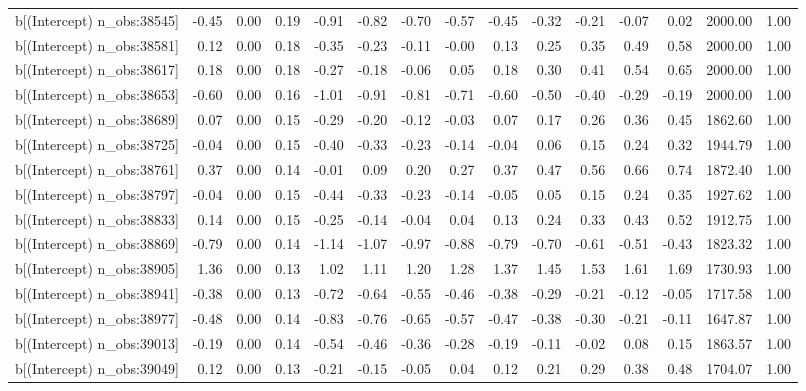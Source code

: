 \begin{table}[ht]
\begin{tabular}{rrrrrrrrrrrrrrr}
  b[(Intercept) n\_obs:38545] & -0.45 & 0.00 & 0.19 & -0.91 & -0.82 & -0.70 & -0.57 & -0.45 & -0.32 & -0.21 & -0.07 & 0.02 & 2000.00 & 1.00 \\ 
  b[(Intercept) n\_obs:38581] & 0.12 & 0.00 & 0.18 & -0.35 & -0.23 & -0.11 & -0.00 & 0.13 & 0.25 & 0.35 & 0.49 & 0.58 & 2000.00 & 1.00 \\ 
  b[(Intercept) n\_obs:38617] & 0.18 & 0.00 & 0.18 & -0.27 & -0.18 & -0.06 & 0.05 & 0.18 & 0.30 & 0.41 & 0.54 & 0.65 & 2000.00 & 1.00 \\ 
  b[(Intercept) n\_obs:38653] & -0.60 & 0.00 & 0.16 & -1.01 & -0.91 & -0.81 & -0.71 & -0.60 & -0.50 & -0.40 & -0.29 & -0.19 & 2000.00 & 1.00 \\ 
  b[(Intercept) n\_obs:38689] & 0.07 & 0.00 & 0.15 & -0.29 & -0.20 & -0.12 & -0.03 & 0.07 & 0.17 & 0.26 & 0.36 & 0.45 & 1862.60 & 1.00 \\ 
  b[(Intercept) n\_obs:38725] & -0.04 & 0.00 & 0.15 & -0.40 & -0.33 & -0.23 & -0.14 & -0.04 & 0.06 & 0.15 & 0.24 & 0.32 & 1944.79 & 1.00 \\ 
  b[(Intercept) n\_obs:38761] & 0.37 & 0.00 & 0.14 & -0.01 & 0.09 & 0.20 & 0.27 & 0.37 & 0.47 & 0.56 & 0.66 & 0.74 & 1872.40 & 1.00 \\ 
  b[(Intercept) n\_obs:38797] & -0.04 & 0.00 & 0.15 & -0.44 & -0.33 & -0.23 & -0.14 & -0.05 & 0.05 & 0.15 & 0.24 & 0.35 & 1927.62 & 1.00 \\ 
  b[(Intercept) n\_obs:38833] & 0.14 & 0.00 & 0.15 & -0.25 & -0.14 & -0.04 & 0.04 & 0.13 & 0.24 & 0.33 & 0.43 & 0.52 & 1912.75 & 1.00 \\ 
  b[(Intercept) n\_obs:38869] & -0.79 & 0.00 & 0.14 & -1.14 & -1.07 & -0.97 & -0.88 & -0.79 & -0.70 & -0.61 & -0.51 & -0.43 & 1823.32 & 1.00 \\ 
  b[(Intercept) n\_obs:38905] & 1.36 & 0.00 & 0.13 & 1.02 & 1.11 & 1.20 & 1.28 & 1.37 & 1.45 & 1.53 & 1.61 & 1.69 & 1730.93 & 1.00 \\ 
  b[(Intercept) n\_obs:38941] & -0.38 & 0.00 & 0.13 & -0.72 & -0.64 & -0.55 & -0.46 & -0.38 & -0.29 & -0.21 & -0.12 & -0.05 & 1717.58 & 1.00 \\ 
  b[(Intercept) n\_obs:38977] & -0.48 & 0.00 & 0.14 & -0.83 & -0.76 & -0.65 & -0.57 & -0.47 & -0.38 & -0.30 & -0.21 & -0.11 & 1647.87 & 1.00 \\ 
  b[(Intercept) n\_obs:39013] & -0.19 & 0.00 & 0.14 & -0.54 & -0.46 & -0.36 & -0.28 & -0.19 & -0.11 & -0.02 & 0.08 & 0.15 & 1863.57 & 1.00 \\ 
  b[(Intercept) n\_obs:39049] & 0.12 & 0.00 & 0.13 & -0.21 & -0.15 & -0.05 & 0.04 & 0.12 & 0.21 & 0.29 & 0.38 & 0.48 & 1704.07 & 1.00 \\ 

\end{tabular}
\end{table}
